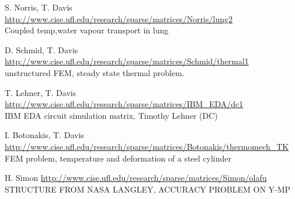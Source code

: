 	{
		{
			S. Norris, T. Davis
		}
		{
			\url{http://www.cise.ufl.edu/research/sparse/matrices/Norris/lung2} \\
			Coupled temp,water vapour transport in lung
		}
	}

	{
		{
			D. Schmid, T. Davis 
		}
		{
			\url{http://www.cise.ufl.edu/research/sparse/matrices/Schmid/thermal1} \\
			unstructured FEM, steady state thermal problem.
		}
	}

	{
		{
			T. Lehner, T. Davis 
		}
		{
			\url{http://www.cise.ufl.edu/research/sparse/matrices/IBM_EDA/dc1} \\
			IBM EDA circuit simulation matrix, Timothy Lehner (DC)
		}
	}

	{
		{
			I. Botonakis, T. Davis
		}
		{
			\url{http://www.cise.ufl.edu/research/sparse/matrices/Botonakis/thermomech_TK} \\
			FEM problem, temperature and deformation of a steel cylinder
		}
	}

	{
		{
			H. Simon
		}
		{
			\url{http://www.cise.ufl.edu/research/sparse/matrices/Simon/olafu} \\
			STRUCTURE FROM NASA LANGLEY, ACCURACY PROBLEM ON Y-MP
		}
	}

